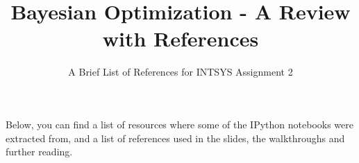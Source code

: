 \documentclass[sigconf]{acmart}
\begin{document}
\title{Bayesian Optimization - A Review with References}
\subtitle{A Brief List of References for INTSYS Assignment 2}


\maketitle

Below, you can find a list of resources where some of the IPython notebooks were extracted from, and a list of references used in the slides, the walkthroughs and further reading. \nocite{*}



 
\end{document}
